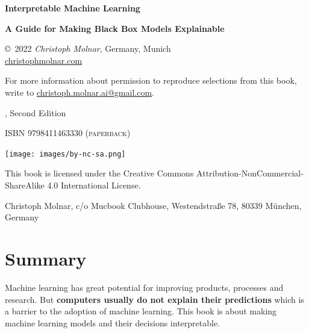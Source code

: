 \documentclass[
  11pt,
]{scrbook}
\begin{document}
\thispagestyle{empty}
\begin{center}
  {
  \bfseries \sffamily \LARGE Interpretable Machine Learning\par
  \bfseries \small A Guide for Making Black Box Models Explainable\par
}

\copyright~2022 \textit{Christoph Molnar}, Germany, Munich\\
\url{christophmolnar.com}

For more information about permission to reproduce selections from this book, write to \url{christoph.molnar.ai@gmail.com}.

	\the\year, Second Edition

\ifxetex
	\textsc{ISBN 9798411463330 (paperback)} 
\fi

\texttt{[image: images/by-nc-sa.png]}

This book is licensed under the Creative Commons Attribution-NonCommercial-ShareAlike 4.0 International License.
  
  Christoph Molnar,
  c/o Mucbook Clubhouse,
  Westendstraße 78,
  80339 München, Germany

\end{center}

\newpage
\thispagestyle{empty}
\mbox{}
\newpage

{
\hypersetup{linkcolor=}
\setcounter{tocdepth}{1}
\tableofcontents
}
\hypertarget{summary}{%
\chapter*{Summary}\label{summary}}


Machine learning has great potential for improving products, processes and research.
But \textbf{computers usually do not explain their predictions} which is a barrier to the adoption of machine learning.
This book is about making machine learning models and their decisions interpretable.
\end{document}
